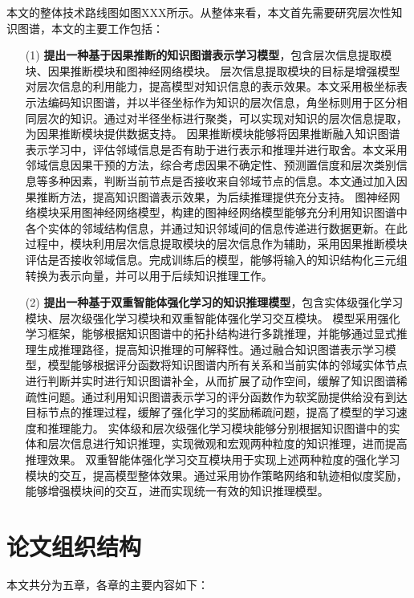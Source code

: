 \documentclass[algorithmlist, AutoFakeBold, AutoFakeSlant, figurelist, tablelist, nomlist, masters]{seuthesix}
\begin{document}
本文的整体技术路线图如图XXX所示。从整体来看，本文首先需要研究层次性知识图谱，本文的主要工作包括：

\begin{itemize}
  \item [(1)]\textbf{提出一种基于因果推断的知识图谱表示学习模型}，包含层次信息提取模块、因果推断模块和图神经网络模块。
  层次信息提取模块的目标是增强模型对层次信息的利用能力，提高模型对知识信息的表示效果。本文采用极坐标表示法编码知识图谱，并以半径坐标作为知识的层次信息，角坐标则用于区分相同层次的知识。通过对半径坐标进行聚类，可以实现对知识的层次信息提取，为因果推断模块提供数据支持。
  因果推断模块能够将因果推断融入知识图谱表示学习中，评估邻域信息是否有助于进行表示和推理并进行取舍。本文采用邻域信息因果干预的方法，综合考虑因果不确定性、预测置信度和层次类别信息等多种因素，判断当前节点是否接收来自邻域节点的信息。本文通过加入因果推断方法，提高知识图谱表示效果，为后续推理提供充分支持。
  图神经网络模块采用图神经网络模型，构建的图神经网络模型能够充分利用知识图谱中各个实体的邻域结构信息，并通过知识邻域间的信息传递进行数据更新。在此过程中，模块利用层次信息提取模块的层次信息作为辅助，采用因果推断模块评估是否接收邻域信息。完成训练后的模型，能够将输入的知识结构化三元组转换为表示向量，并可以用于后续知识推理工作。
  \item [(2)]\textbf{提出一种基于双重智能体强化学习的知识推理模型}，包含实体级强化学习模块、层次级强化学习模块和双重智能体强化学习交互模块。
  模型采用强化学习框架，能够根据知识图谱中的拓扑结构进行多跳推理，并能够通过显式推理生成推理路径，提高知识推理的可解释性。通过融合知识图谱表示学习模型，模型能够根据评分函数将知识图谱内所有关系和当前实体的邻域实体节点进行判断并实时进行知识图谱补全，从而扩展了动作空间，缓解了知识图谱稀疏性问题。通过利用知识图谱表示学习的评分函数作为软奖励提供给没有到达目标节点的推理过程，缓解了强化学习的奖励稀疏问题，提高了模型的学习速度和推理能力。
  实体级和层次级强化学习模块能够分别根据知识图谱中的实体和层次信息进行知识推理，实现微观和宏观两种粒度的知识推理，进而提高推理效果。
  双重智能体强化学习交互模块用于实现上述两种粒度的强化学习模块的交互，提高模型整体效果。通过采用协作策略网络和轨迹相似度奖励，能够增强模块间的交互，进而实现统一有效的知识推理模型。
\end{itemize}


\section{论文组织结构}
本文共分为五章，各章的主要内容如下：
\end{document}
